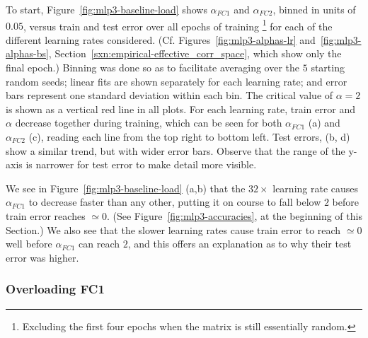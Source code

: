 
To start, Figure~\ref{fig:mlp3-baseline-load} shows $\alpha_{FC1}$ and $\alpha_{FC2}$, binned in units of $0.05$, versus 
train and test error over all epochs of training
\footnote{Excluding the first four epochs when the matrix is still essentially random.} 
for each of the different learning rates considered. 
(Cf. Figures~\ref{fig:mlp3-alphas-lr} and~\ref{fig:mlp3-alphas-bs}, Section~\ref{sxn:empirical-effective_corr_space},
which show only the final epoch.)
Binning was done so as to facilitate averaging over the $5$ starting random seeds; 
linear fits are shown separately for each learning rate; and
error bars represent one standard deviation within each bin. 
The critical value of $\alpha=2$ is shown as a vertical red line in all plots. 
For each learning rate, train error and $\alpha$ decrease together during training, which can be seen for both 
$\alpha_{FC1}$ (a) and $\alpha_{FC2}$ (c), reading each line from the top right to bottom left. Test errors, (b, d) show 
a similar trend, but with wider error bars. 
Observe that the range of the y-axis is narrower for test error to make detail more visible.

We see in Figure~\ref{fig:mlp3-baseline-load} (a,b) 
that the $32\times$ learning rate causes $\alpha_{FC1}$ to decrease faster than any other, putting it on course to 
fall below $2$ before train error reaches $\simeq 0$. 
(See Figure~\ref{fig:mlp3-accuracies}, at the beginning of this Section.) 
We also see that the slower learning rates cause train error to reach $\simeq 0$ well before $\alpha_{FC1}$ can reach $2$, and this offers an explanation as to why their test error was higher.



\subsubsection{Overloading FC1}
\label{sxn:hysteresis_effect_FC1}


